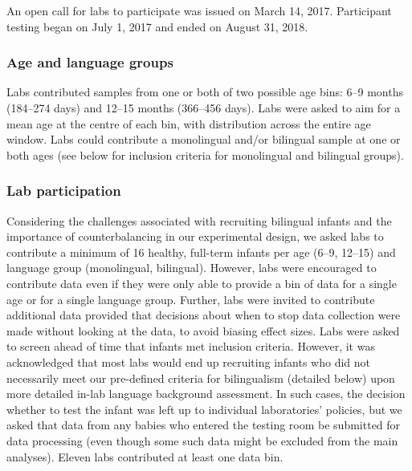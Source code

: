 \documentclass[english,,man,floatsintext]{apa6}
\begin{document}
An open call for labs to participate was issued on March 14, 2017. Participant testing began on July 1, 2017 and ended on August 31, 2018.

\hypertarget{age-and-language-groups}{%
\subsubsection{Age and language groups}\label{age-and-language-groups}}

Labs contributed samples from one or both of two possible age bins: 6--9 months (184--274 days) and 12--15 months (366--456 days). Labs were asked to aim for a mean age at the centre of each bin, with distribution across the entire age window. Labs could contribute a monolingual and/or bilingual sample at one or both ages (see below for inclusion criteria for monolingual and bilingual groups).

\hypertarget{lab-participation}{%
\subsubsection{Lab participation}\label{lab-participation}}

Considering the challenges associated with recruiting bilingual infants and the importance of counterbalancing in our experimental design, we asked labs to contribute a minimum of 16 healthy, full-term infants per age (6--9, 12--15) and language group (monolingual, bilingual). However, labs were encouraged to contribute data even if they were only able to provide a bin of data for a single age or for a single language group. Further, labs were invited to contribute additional data provided that decisions about when to stop data collection were made without looking at the data, to avoid biasing effect sizes. Labs were asked to screen ahead of time that infants met inclusion criteria. However, it was acknowledged that most labs would end up recruiting infants who did not necessarily meet our pre-defined criteria for bilingualism (detailed below) upon more detailed in-lab language background assessment. In such cases, the decision whether to test the infant was left up to individual laboratories' policies, but we asked that data from any babies who entered the testing room be submitted for data processing (even though some such data might be excluded from the main analyses). Eleven labs contributed at least one data bin.
\end{document}
